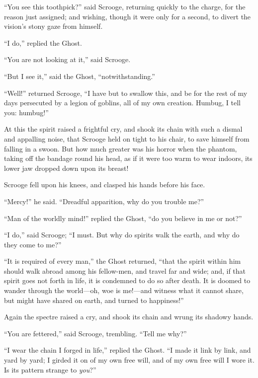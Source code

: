 \documentclass[paper=5.5in:8.5in,BCOR=15mm,twoside,DIV=15,headinclude=off,12pt,chapterprefix=off,openany,headings=huge]{scrbook} %
\begin{document}
\enquote{You see this toothpick?} said Scrooge, returning quickly to the charge, for the reason just assigned; and wishing, though it were only for a second, to divert the vision's stony gaze from himself.

\enquote{I do,} replied the Ghost.

\enquote{You are not looking at it,} said Scrooge.

\enquote{But I see it,} said the Ghost, \enquote{notwithstanding.}

\enquote{Well!} returned Scrooge, \enquote{I have but to swallow this, and be for the rest of my days persecuted by a legion of goblins, all of my own creation. Humbug, I tell you: humbug!}

At this the spirit raised a frightful cry, and shook its chain with such a dismal and appalling noise, that Scrooge held on tight to his chair, to save himself from falling in a swoon. But how much greater was his horror when the phantom, taking off the bandage round his head, as if it were too warm to wear indoors, its lower jaw dropped down upon its breast!

Scrooge fell upon his knees, and clasped his hands before his face.

\enquote{Mercy!} he said. \enquote{Dreadful apparition, why do you trouble me?}

\enquote{Man of the worldly mind!} replied the Ghost, \enquote{do you believe in me or not?}

\enquote{I do,} said Scrooge; \enquote{I must. But why do spirits walk the earth, and why do they come to me?}

\enquote{It is required of every man,} the Ghost returned, \enquote{that the spirit within him should walk abroad among his fellow-men, and travel far and wide; and, if that spirit goes not forth in life, it is condemned to do so after death. It is doomed to wander through the world—oh, woe is me!—and witness what it cannot share, but might have shared on earth, and turned to happiness!}

Again the spectre raised a cry, and shook its chain and wrung its shadowy hands.

\enquote{You are fettered,} said Scrooge, trembling. \enquote{Tell me why?}

\enquote{I wear the chain I forged in life,} replied the Ghost. \enquote{I made it link by link, and yard by yard; I girded it on of my own free will, and of my own free will I wore it. Is its pattern strange to \textit{you}?}
\end{document}
